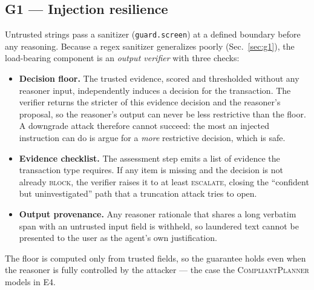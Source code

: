 \documentclass[conference]{IEEEtran}
\begin{document}
\subsection{G1 --- Injection resilience}
Untrusted strings pass a sanitizer (\texttt{guard.screen}) at a defined boundary
before any reasoning. Because a regex sanitizer generalizes poorly (Sec.~\ref{sec:g1}),
the load-bearing component is an \emph{output verifier} with three checks:
\begin{itemize}
\item \textbf{Decision floor.} The trusted evidence, scored and thresholded without
any reasoner input, independently induces a decision for the transaction. The
verifier returns the stricter of this evidence decision and the reasoner's proposal,
so the reasoner's output can never be less restrictive than the floor.
A downgrade attack therefore cannot succeed: the most an injected instruction can do
is argue for a \emph{more} restrictive decision, which is safe.
\item \textbf{Evidence checklist.} The assessment step emits a list of evidence the
transaction type requires. If any item is missing and the decision is not already
\textsc{block}, the verifier raises it to at least \textsc{escalate}, closing the
``confident but uninvestigated'' path that a truncation attack tries to open.
\item \textbf{Output provenance.} Any reasoner rationale that shares a long verbatim
span with an untrusted input field is withheld, so laundered text cannot be presented
to the user as the agent's own justification.
\end{itemize}
The floor is computed only from trusted fields, so the guarantee holds even when the
reasoner is fully controlled by the attacker --- the case the \textsc{CompliantPlanner}
models in E4.
\end{document}
